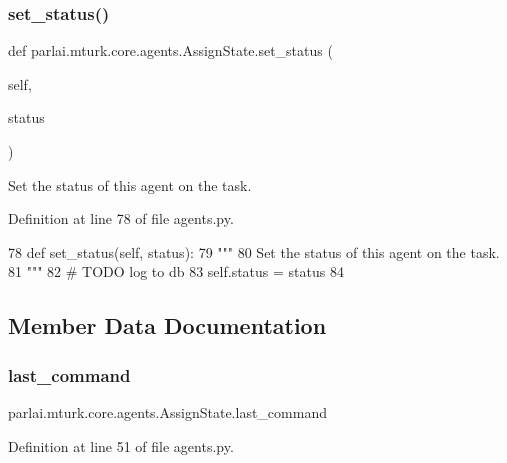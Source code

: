 \subsubsection{\texorpdfstring{set\+\_\+status()}{set\_status()}}
{\footnotesize\ttfamily def parlai.\+mturk.\+core.\+agents.\+Assign\+State.\+set\+\_\+status (\begin{DoxyParamCaption}\item[{}]{self,  }\item[{}]{status }\end{DoxyParamCaption})}

\begin{DoxyVerb}Set the status of this agent on the task.
\end{DoxyVerb}
 

Definition at line 78 of file agents.\+py.


\begin{DoxyCode}
78     \textcolor{keyword}{def }set\_status(self, status):
79         \textcolor{stringliteral}{"""}
80 \textcolor{stringliteral}{        Set the status of this agent on the task.}
81 \textcolor{stringliteral}{        """}
82         \textcolor{comment}{# TODO log to db}
83         self.status = status
84 
\end{DoxyCode}


\subsection{Member Data Documentation}
\mbox{\label{classparlai_1_1mturk_1_1core_1_1agents_1_1AssignState_a055a267b03cf1ad3aed703ca83b52597}} 
\subsubsection{\texorpdfstring{last\+\_\+command}{last\_command}}
{\footnotesize\ttfamily parlai.\+mturk.\+core.\+agents.\+Assign\+State.\+last\+\_\+command}



Definition at line 51 of file agents.\+py.

\mbox{\label{classparlai_1_1mturk_1_1core_1_1agents_1_1AssignState_a11bf85034efc6e223c6a58a695b022b8}} 
